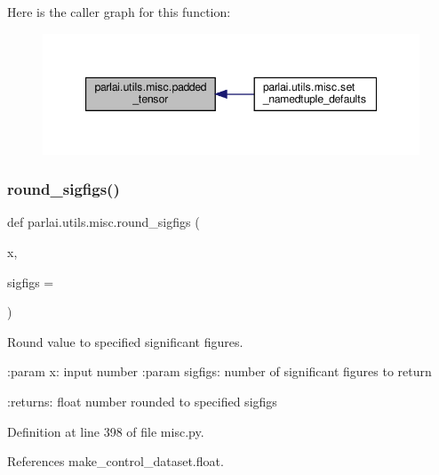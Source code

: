 Here is the caller graph for this function\+:
\nopagebreak
\begin{figure}[H]
\begin{center}
\leavevmode
\includegraphics[width=347pt]{namespaceparlai_1_1utils_1_1misc_ad3f3c350e8b394482f73a240e19ec3ac_icgraph}
\end{center}
\end{figure}
\mbox{\label{namespaceparlai_1_1utils_1_1misc_af245c261b10f36175f6d88fce852c552}} 
\subsubsection{\texorpdfstring{round\+\_\+sigfigs()}{round\_sigfigs()}}
{\footnotesize\ttfamily def parlai.\+utils.\+misc.\+round\+\_\+sigfigs (\begin{DoxyParamCaption}\item[{}]{x,  }\item[{}]{sigfigs = {} }\end{DoxyParamCaption})}

\begin{DoxyVerb}Round value to specified significant figures.

:param x: input number
:param sigfigs: number of significant figures to return

:returns: float number rounded to specified sigfigs
\end{DoxyVerb}
 

Definition at line 398 of file misc.\+py.



References make\+\_\+control\+\_\+dataset.\+float.

\mbox{\label{namespaceparlai_1_1utils_1_1misc_a8781cc03272b3a118fcd9e5a9f4ca1dd}} 
